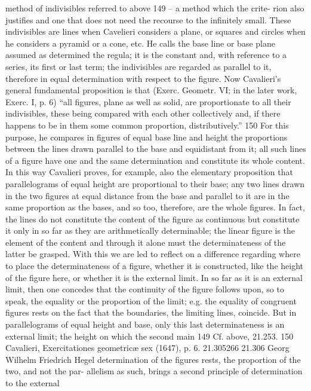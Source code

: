 method of indivisibles referred to above 149 – a method which the crite-
rion also justifies and one that does not need the recourse to the infinitely
small. These indivisibles are lines when Cavelieri considers a plane, or
squares and circles when he considers a pyramid or a cone, etc. He calls the
base line or base plane assumed as determined the regula; it is the constant
and, with reference to a series, its first or last term; the indivisibles are
regarded as parallel to it, therefore in equal determination with respect to
the figure. Now Cavalieri’s general fundamental proposition is that (Exerc.
Geometr. VI; in the later work, Exerc. I, p. 6) “all figures, plane as well as
solid, are proportionate to all their indivisibles, these being compared with
each other collectively and, if there happens to be in them some common
proportion, distributively.” 150 For this purpose, he compares in figures of
equal base line and height the proportions between the lines drawn parallel
to the base and equidistant from it; all such lines of a figure have one and the
same determination and constitute its whole content. In this way Cavalieri
proves, for example, also the elementary proposition that parallelograms
of equal height are proportional to their base; any two lines drawn in the
two figures at equal distance from the base and parallel to it are in the
same proportion as the bases, and so too, therefore, are the whole figures.
In fact, the lines do not constitute the content of the figure as continuous
but constitute it only in so far as they are arithmetically determinable; the
linear figure is the element of the content and through it alone must the
determinateness of the latter be grasped.
With this we are led to reflect on a difference regarding where to place
the determinateness of a figure, whether it is constructed, like the height of
the figure here, or whether it is the external limit. In so far as it is an external
limit, then one concedes that the continuity of the figure follows upon, so
to speak, the equality or the proportion of the limit; e.g. the equality of
congruent figures rests on the fact that the boundaries, the limiting lines,
coincide. But in parallelograms of equal height and base, only this last
determinateness is an external limit; the height on which the second main
149
Cf. above, 21.253.
150
Cavalieri, Exercitationes geometricæ sex (1647), p. 6.
21.305266
21.306
Georg Wilhelm Friedrich Hegel
determination of the figures rests, the proportion of the two, and not the par-
allelism as such, brings a second principle of determination to the external
